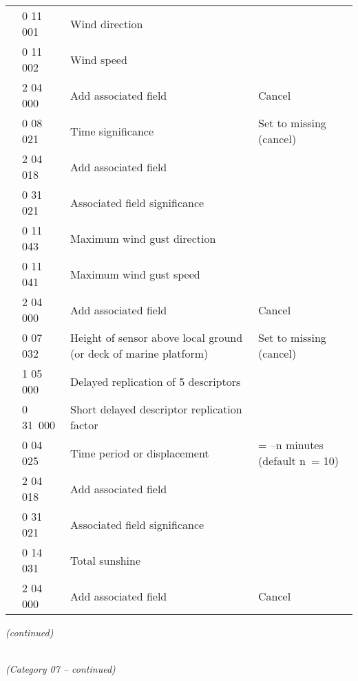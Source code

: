 \begin{longtable}[]{@{}llll@{}}
& 0 11 001 & Wind direction &\tabularnewline
& 0 11 002 & Wind speed &\tabularnewline
& 2 04 000 & Add associated field & Cancel\tabularnewline
& 0 08 021 & Time significance & Set to missing (cancel)\tabularnewline
& 2 04 018 & Add associated field &\tabularnewline
& 0 31 021 & Associated field significance &\tabularnewline
& 0 11 043 & Maximum wind gust direction &\tabularnewline
& 0 11 041 & Maximum wind gust speed &\tabularnewline
& 2 04 000 & Add associated field & Cancel\tabularnewline
& 0 07 032 & Height of sensor above local ground (or deck of marine platform) & Set to missing (cancel)\tabularnewline
& 1 05 000 & Delayed replication of 5 descriptors &\tabularnewline
& 0 31~000 & Short delayed descriptor replication factor &\tabularnewline
& 0 04 025 & Time period or displacement & = --n minutes (default n~= 10)\tabularnewline
& 2 04 018 & Add associated field &\tabularnewline
& 0 31 021 & Associated field significance &\tabularnewline
& 0 14 031 & Total sunshine &\tabularnewline
& 2 04 000 & Add associated field & Cancel\tabularnewline
\bottomrule
\end{longtable}

\emph{(continued)}

\emph{\\
(Category 07 -- continued)}

